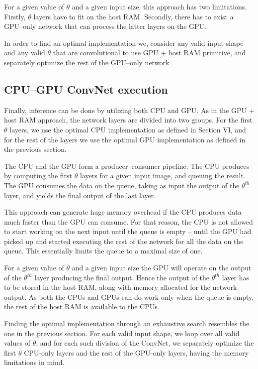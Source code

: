 \documentclass[conference]{./IEEEtran/IEEEtran}
\begin{document}
  For a given value of $\theta$ and a given input size, this approach
  has two limitations.  Firstly, $\theta$ layers have to fit on the
  host RAM.  Secondly, there has to exist a GPU--only network that can
  process the latter layers on the GPU.

  In order to find an optimal implementation we, consider any valid
  input shape and any valid $\theta$ that are convolutional to use GPU
  + host RAM primitive, and separately optimize the rest of the
  GPU--only network

\subsection{CPU--GPU ConvNet execution}

  Finally, inference can be done by utilizing both CPU and GPU.  As in
  the GPU + host RAM approach, the network layers are divided into two
  groups.  For the first $\theta$ layers, we use the optimal CPU
  implementation as defined in Section VI, and for the rest of the
  layers we use the optimal GPU implementation as defined in the
  previous section.

  The CPU and the GPU form a producer--consumer pipeline.  The CPU
  produces by computing the first $\theta$ layers for a given input
  image, and queuing the result.  The GPU consumes the data on the
  queue, taking as input the output of the $\theta^{th}$ layer, and
  yields the final output of the last layer.

  This approach can generate huge memory overhead if the CPU produces
  data much faster than the GPU can consume.  For that reason, the CPU
  is not allowed to start working on the next input until the queue is
  empty -- until the GPU had picked up and started executing the rest
  of the network for all the data on the queue.  This essentially
  limits the queue to a maximal size of one.

  For a given value of $\theta$ and a given input size the GPU will
  operate on the output of the $\theta^{th}$ layer producing the final
  output.  Hence the output of the $\theta^{th}$ layer has to be
  stored in the host RAM, along with memory allocated for the network
  output.  As both the CPUs and GPUs can do work only when the queue
  is empty, the rest of the host RAM is available to the CPUs.

  Finding the optimal implementation through an exhaustive search
  resembles the one in the previous section.  For each valid input
  shape, we loop over all valid values of $\theta$, and for each such
  division of the ConvNet, we separately optimize the first $\theta$
  CPU-only layers and the rest of the GPU-only layers, having the
  memory limitations in mind.
\end{document}

